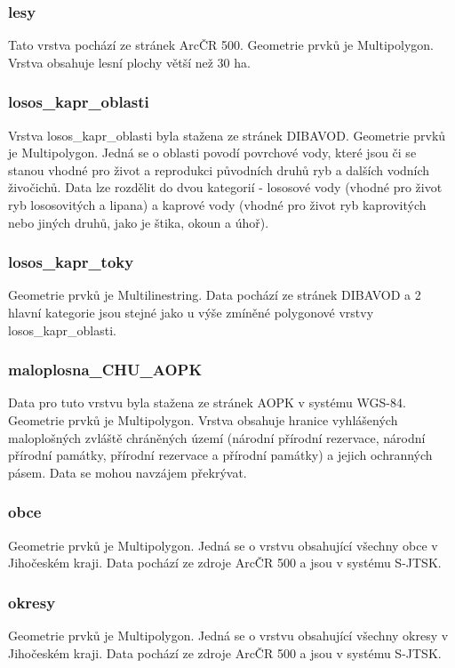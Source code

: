 \documentclass[a4paper, 12pt]{article}
\begin{document}
\subsubsection{lesy}
Tato vrstva pochází ze stránek ArcČR 500. Geometrie prvků je Multipolygon. Vrstva obsahuje lesní plochy větší než 30 ha. 

\subsubsection{losos\_kapr\_oblasti}
Vrstva losos\_kapr\_oblasti byla stažena ze stránek DIBAVOD. Geometrie prvků je Multipolygon. Jedná se o oblasti povodí povrchové vody, které jsou či se stanou vhodné pro život a reprodukci původních druhů ryb a dalších vodních živočichů. Data lze rozdělit do dvou kategorií - lososové vody (vhodné pro život ryb lososovitých a lipana) a kaprové vody (vhodné pro život ryb kaprovitých nebo jiných druhů, jako je štika, okoun a úhoř). 


\subsubsection{losos\_kapr\_toky}
Geometrie prvků je Multilinestring. Data pochází ze stránek DIBAVOD a 2 hlavní kategorie jsou stejné jako u výše zmíněné polygonové vrstvy losos\_kapr\_oblasti.


\subsubsection{maloplosna\_CHU\_AOPK}
Data pro tuto vrstvu byla stažena ze stránek AOPK v systému WGS-84. Geometrie prvků je Multipolygon. Vrstva obsahuje hranice vyhlášených maloplošných zvláště chráněných území (národní přírodní rezervace, národní přírodní památky, přírodní rezervace a přírodní památky) a jejich ochranných pásem. Data se mohou navzájem překrývat. 


\subsubsection{obce}
Geometrie prvků je Multipolygon. Jedná se o vrstvu obsahující všechny obce v Jihočeském kraji. Data pochází ze zdroje ArcČR 500 a jsou v systému S-JTSK.

\subsubsection{okresy}
Geometrie prvků je Multipolygon. Jedná se o vrstvu obsahující všechny okresy v Jihočeském kraji. Data pochází ze zdroje ArcČR 500 a jsou v systému S-JTSK.
\end{document}
